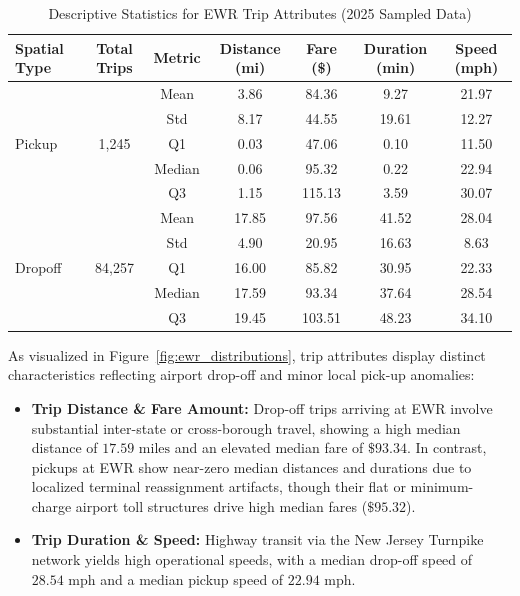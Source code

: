 \documentclass[11pt,a4paper]{article}
\begin{document}
\begin{table}[htbp]
    \centering
    \caption{Descriptive Statistics for EWR Trip Attributes (2025 Sampled Data)}
    \label{tab:ewr_stats}
    \small
    \begin{tabular}{lcccccc}
        \toprule
        \textbf{Spatial Type} & \textbf{Total Trips} & \textbf{Metric} & \textbf{Distance (mi)} & \textbf{Fare (\$)} & \textbf{Duration (min)} & \textbf{Speed (mph)} \\
        \midrule
        \multirow{5}{*}{Pickup} & \multirow{5}{*}{1,245} 
        & Mean & 3.86 & 84.36 & 9.27 & 21.97 \\
        & & Std & 8.17 & 44.55 & 19.61 & 12.27 \\
        & & Q1 & 0.03 & 47.06 & 0.10 & 11.50 \\
        & & Median & 0.06 & 95.32 & 0.22 & 22.94 \\
        & & Q3 & 1.15 & 115.13 & 3.59 & 30.07 \\
        \midrule
        \multirow{5}{*}{Dropoff} & \multirow{5}{*}{84,257} 
        & Mean & 17.85 & 97.56 & 41.52 & 28.04 \\
        & & Std & 4.90 & 20.95 & 16.63 & 8.63 \\
        & & Q1 & 16.00 & 85.82 & 30.95 & 22.33 \\
        & & Median & 17.59 & 93.34 & 37.64 & 28.54 \\
        & & Q3 & 19.45 & 103.51 & 48.23 & 34.10 \\
        \bottomrule
    \end{tabular}
\end{table}

As visualized in Figure~\ref{fig:ewr_distributions}, trip attributes display distinct characteristics reflecting airport drop-off and minor local pick-up anomalies:
\begin{itemize}
    \item \textbf{Trip Distance \& Fare Amount:} Drop-off trips arriving at EWR involve substantial inter-state or cross-borough travel, showing a high median distance of $17.59\text{ miles}$ and an elevated median fare of $\$93.34$. In contrast, pickups at EWR show near-zero median distances and durations due to localized terminal reassignment artifacts, though their flat or minimum-charge airport toll structures drive high median fares ($\$95.32$).
    \item \textbf{Trip Duration \& Speed:} Highway transit via the New Jersey Turnpike network yields high operational speeds, with a median drop-off speed of $28.54\text{ mph}$ and a median pickup speed of $22.94\text{ mph}$.
\end{itemize}
\end{document}
